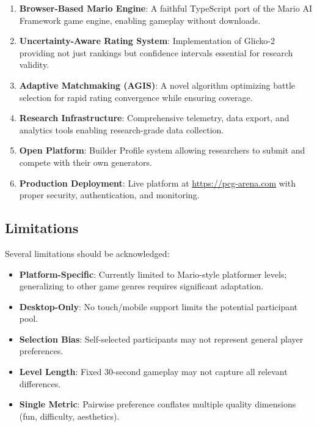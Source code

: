 \documentclass[11pt,a4paper]{article}
\theoremstyle{plain}
\theoremstyle{definition}
\theoremstyle{remark}
\begin{document}
\begin{enumerate}
    \item \textbf{Browser-Based Mario Engine}: A faithful TypeScript port of the Mario AI Framework game engine, enabling gameplay without downloads.
    
    \item \textbf{Uncertainty-Aware Rating System}: Implementation of Glicko-2 providing not just rankings but confidence intervals essential for research validity.
    
    \item \textbf{Adaptive Matchmaking (AGIS)}: A novel algorithm optimizing battle selection for rapid rating convergence while ensuring coverage.
    
    \item \textbf{Research Infrastructure}: Comprehensive telemetry, data export, and analytics tools enabling research-grade data collection.
    
    \item \textbf{Open Platform}: Builder Profile system allowing researchers to submit and compete with their own generators.
    
    \item \textbf{Production Deployment}: Live platform at \url{https://pcg-arena.com} with proper security, authentication, and monitoring.
\end{enumerate}

\subsection{Limitations}
\label{subsec:limitations}

Several limitations should be acknowledged:

\begin{itemize}
    \item \textbf{Platform-Specific}: Currently limited to Mario-style platformer levels; generalizing to other game genres requires significant adaptation.
    
    \item \textbf{Desktop-Only}: No touch/mobile support limits the potential participant pool.
    
    \item \textbf{Selection Bias}: Self-selected participants may not represent general player preferences.
    
    \item \textbf{Level Length}: Fixed 30-second gameplay may not capture all relevant differences.
    
    \item \textbf{Single Metric}: Pairwise preference conflates multiple quality dimensions (fun, difficulty, aesthetics).
\end{itemize}
\end{document}
